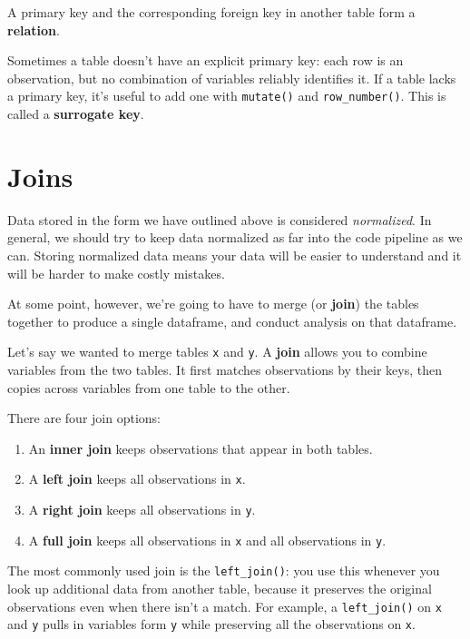 \documentclass[]{book}
\providecommand{\tightlist}{%
  \setlength{\itemsep}{0pt}\setlength{\parskip}{0pt}}
\begin{document}
A primary key and the corresponding foreign key in another table form a \textbf{relation}.

Sometimes a table doesn't have an explicit primary key: each row is an observation, but no combination of variables reliably identifies it. If a table lacks a primary key, it's useful to add one with \texttt{mutate()} and \texttt{row\_number()}. This is called a \textbf{surrogate key}.

\hypertarget{joins}{%
\section{Joins}\label{joins}}

Data stored in the form we have outlined above is considered \emph{normalized}. In general, we should try to keep data normalized as far into the code pipeline as we can. Storing normalized data means your data will be easier to understand and it will be harder to make costly mistakes.

At some point, however, we're going to have to merge (or \textbf{join}) the tables together to produce a single dataframe, and conduct analysis on that dataframe.

Let's say we wanted to merge tables \texttt{x} and \texttt{y}. A \textbf{join} allows you to combine variables from the two tables. It first matches observations by their keys, then copies across variables from one table to the other.

There are four join options:

\begin{enumerate}
\def\labelenumi{\arabic{enumi}.}
\tightlist
\item
  An \textbf{inner join} keeps observations that appear in both tables.
\item
  A \textbf{left join} keeps all observations in \texttt{x}.
\item
  A \textbf{right join} keeps all observations in \texttt{y}.
\item
  A \textbf{full join} keeps all observations in \texttt{x} and all observations in \texttt{y}.
\end{enumerate}

The most commonly used join is the \texttt{left\_join()}: you use this whenever you look up additional data from another table, because it preserves the original observations even when there isn't a match. For example, a \texttt{left\_join()} on \texttt{x} and \texttt{y} pulls in variables form \texttt{y} while preserving all the observations on \texttt{x}.
\end{document}
